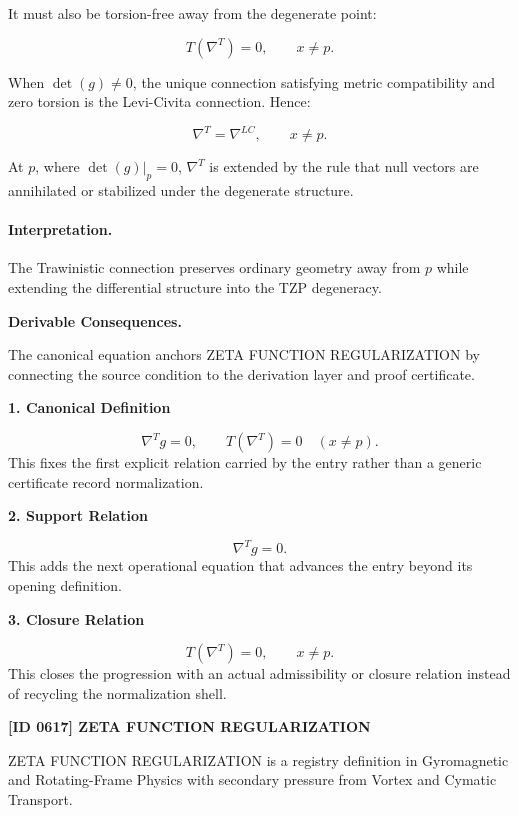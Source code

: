 It must also be torsion-free away from the degenerate point:

\begin{equation}
T(\nabla^{T})=0,
\qquad x\neq p .
\end{equation}

When $\det(g)\neq 0$, the unique connection satisfying metric compatibility and zero torsion is the Levi-Civita connection. Hence:

\begin{equation}
\nabla^{T}=\nabla^{LC},
\qquad x\neq p .
\end{equation}

At $p$, where $\det(g)|_p=0$, $\nabla^{T}$ is extended by the rule that null vectors are annihilated or stabilized under the degenerate structure.

\paragraph{Interpretation.}
The Trawinistic connection preserves ordinary geometry away from $p$ while extending the differential structure into the TZP degeneracy.

\par\vspace{0.35em}
\noindent\textbf{Derivable Consequences.}\quad
\begingroup
\footnotesize
\raggedright
The canonical equation anchors ZETA FUNCTION REGULARIZATION by connecting the source condition to the derivation layer and proof certificate.
\par\endgroup

\noindent\textbf{1. Canonical Definition}\par
\[
\nabla^{T}g=0, \qquad T(\nabla^{T})=0 \quad (x\neq p).
\]
\noindent This fixes the first explicit relation carried by the entry rather than a generic certificate record normalization.\par
\noindent\textbf{2. Support Relation}\par
\[
\nabla^{T}g=0.
\]
\noindent This adds the next operational equation that advances the entry beyond its opening definition.\par
\noindent\textbf{3. Closure Relation}\par
\[
T(\nabla^{T})=0, \qquad x\neq p.
\]
\noindent This closes the progression with an actual admissibility or closure relation instead of recycling the normalization shell.\par

\clearpage
\noindent\textbf{[ID 0617] ZETA FUNCTION REGULARIZATION}\par
\vspace{0.35em}
\begingroup\small
{}
ZETA FUNCTION REGULARIZATION is a registry definition in Gyromagnetic and Rotating-Frame Physics with secondary pressure from Vortex and Cymatic Transport.

